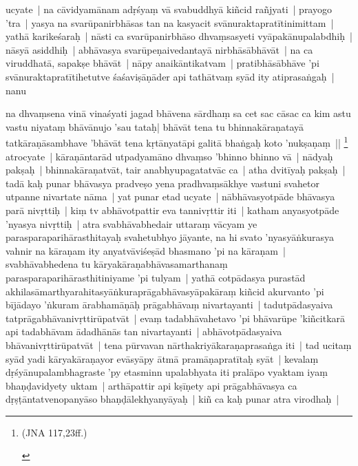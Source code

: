 \documentclass[article,12pt,a4paper]{memoir}
\begin{document}
	  \pstart ucyate | na cāvidyamānam adṛśyaṃ vā svabuddhyā kiñcid rañjyati | \label{thakur75-120.11} prayogo 'tra | yasya na svarūpanirbhāsas tan na kasyacit svānuraktapratītinimittam | yathā karikeśaraḥ | nāsti ca svarūpanirbhāso dhvaṃsasyeti vyāpakānupalabdhiḥ | nāsyā asiddhiḥ | abhāvasya svarūpeṇaivedantayā nirbhāsābhāvāt | na ca viruddhatā, sapakṣe bhāvāt | nāpy anaikāntikatvam | pratibhāsābhāve 'pi svānuraktapratītihetutve śaśaviṣāṇāder api tathātvaṃ syād ity atiprasaṅgaḥ | \label{thakur75-120.17} nanu
	\pend
      

	  \pstart na dhvaṃsena vinā vinaśyati jagad bhāvena sārdhaṃ sa cet sac cāsac ca kim astu vastu niyataṃ bhāvānujo 'sau tataḥ| bhāvāt tena tu bhinnakāraṇatayā tatkāraṇāsambhave 'bhāvāt tena kṛtānyatāpi galitā bhaṅgaḥ koto 'nukṣaṇaṃ || \footnote{\begin{english}(JNA 117,23ff.)\end{english}} \label{thakur75-120.22} atrocyate | kāraṇāntarād utpadyamāno dhvaṃso 'bhinno bhinno vā | \label{thakur75-120.22a} nādyaḥ pakṣaḥ | bhinnakāraṇatvāt, tair anabhyupagatatvāc ca | atha dvitīyaḥ pakṣaḥ | tadā kaḥ punar bhāvasya pradveṣo yena pradhvaṃsākhye vastuni svahetor utpanne nivartate nāma | \label{thakur75-120.25} yat punar etad ucyate | nābhāvasyotpāde bhāvasya parā nivṛttiḥ | kiṃ tv abhāvotpattir eva tannivṛttir iti | katham anyasyotpāde 'nyasya nivṛttiḥ | atra svabhāvabhedair uttaraṃ vācyam ye parasparaparihārasthitayaḥ svahetubhyo jāyante, na hi svato 'nyasyāṅkurasya vahnir na kāraṇam ity anyatvāviśeṣād bhasmano 'pi na kāraṇam | svabhāvabhedena tu kāryakāraṇabhāvasamarthanaṃ parasparaparihārasthitiniyame 'pi tulyam | yathā cotpādasya purastād akhilasāmarthyarahitasyāṅkuraprāgabhāvasyāpakāraṃ kiñcid akurvanto 'pi bījādayo 'ṅkuram ārabhamāṇāḥ prāgabhāvaṃ nivartayanti | tadutpādasyaiva tatprāgabhāvanivṛttirūpatvāt | evaṃ tadabhāvahetavo 'pi bhāvarūpe 'kiñcitkarā api tadabhāvam ādadhānās tan nivartayanti | abhāvotpādasyaiva bhāvanivṛttirūpatvāt | tena pūrvavan nārthakriyākaraṇaprasaṅga iti | \label{thakur75-121.2} tad ucitaṃ syād yadi kāryakāraṇayor evāsyāpy ātmā pramāṇapratītaḥ syāt | kevalaṃ dṛśyānupalambhagraste 'py etasminn upalabhyata iti pralāpo vyaktam iyaṃ bhaṇḍavidyety uktam | \label{thakur75-121.4} arthāpattir api kṣīṇety api prāgabhāvasya ca dṛṣṭāntatvenopanyāso bhaṇḍālekhyanyāyaḥ | \label{thakur75-121.6} kiñ ca kaḥ punar atra virodhaḥ |
	\pend
      
\end{document}
